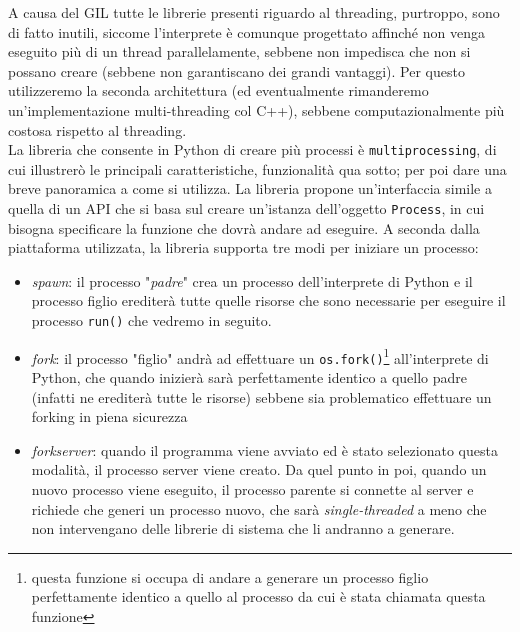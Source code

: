 \documentclass{report}
\begin{document}
\noindent A causa del GIL tutte le librerie presenti riguardo al threading, purtroppo, sono di fatto inutili, siccome l'interprete è comunque progettato affinché non venga eseguito più di un thread parallelamente, sebbene non impedisca che non si possano creare (sebbene non garantiscano dei grandi vantaggi). Per questo utilizzeremo la seconda architettura (ed eventualmente rimanderemo un'implementazione multi-threading col C++), sebbene computazionalmente più costosa rispetto al threading. \\
La libreria che consente in Python di creare più processi è \texttt{multiprocessing}, di cui illustrerò le principali caratteristiche, funzionalità qua sotto; per poi dare una breve panoramica a come si utilizza. La libreria propone un'interfaccia simile a quella di un API che si basa sul creare un'istanza dell'oggetto \texttt{Process}, in cui bisogna specificare la funzione che dovrà andare ad eseguire. A seconda dalla piattaforma utilizzata, la libreria supporta tre modi per iniziare un processo:
\begin{itemize}
	\item \emph{spawn}: il processo "\emph{padre}" crea un processo dell'interprete di Python e il processo figlio erediterà tutte quelle risorse che sono necessarie per eseguire il processo \texttt{run()} che vedremo in seguito.
	\item \emph{fork}: il processo "figlio" andrà ad effettuare un \texttt{os.fork()}\footnote{questa funzione si occupa di andare a generare un processo figlio perfettamente identico a quello al processo da cui è stata chiamata questa funzione} all'interprete di Python, che quando inizierà sarà perfettamente identico a quello padre (infatti ne erediterà tutte le risorse) sebbene sia problematico effettuare un forking in piena sicurezza
	\item \emph{forkserver}: quando il programma viene avviato ed è stato selezionato questa modalità, il processo server viene creato. Da quel punto in poi, quando un nuovo processo viene eseguito, il processo parente si connette al server e richiede che generi un processo nuovo, che sarà \emph{single-threaded} a meno che non intervengano delle librerie di sistema che li andranno a generare. 
\end{itemize}
\end{document}
